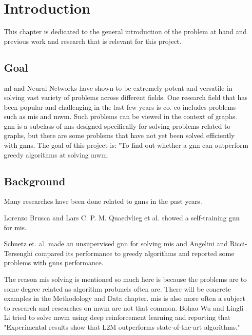 \chapter{Introduction}

This chapter is dedicated to the general introduction of the problem at hand and previous work and research that is relevant for this project.

\section{Goal}

\gls{ml} and Neural Networks have shown to be extremely potent and versatile in solving vast variety of problems across different fields. One research field that has been popular and challenging in the last few years is \gls{co}. \gls{co} includes problems such as \gls{mis} and \gls{mwm}. Such problems can be viewed in the context of graphs. \gls{gnn} is a subclass of \gls{nn}s designed specifically for solving problems related to graphs, but there are some problems that have not yet been solved efficiently with \gls{gnn}s. The goal of this project is: "To find out whether a \gls{gnn} can outperform greedy algorithms at solving \gls{mwm}. 

\section{Background}
\label{sec:background}

Many researches have been done related to \gls{gnn}s in the past years. 

Lorenzo Brusca and Lars C. P. M. Quaedvlieg et al. \cite{brusca2023maximum} showed a self-training \gls{gnn} for \gls{mis}. 

Schuetz et. al. made an unsupervised \gls{gnn} \cite{Schuetz2022} for solving \gls{mis} and Angelini and Ricci-Tersenghi \cite{Angelini2022} compared  its performance to greedy algorithms and reported some problems with \gls{gnn}s performance.

The reason \gls{mis} solving is mentioned so much here is because the problems are to some degree related as algorithm probmels often are. There will be concrete examples in the Methodology and Data chapter. \gls{mis} is also more often a subject to research and researches on \gls{mwm} are not that common. Bohao Wu and Lingli Li tried to solve \gls{mwm} using deep reinforcement learning \cite{WU2022400} and reporting that "Experimental results show that L2M outperforms state-of-the-art algorithms."



